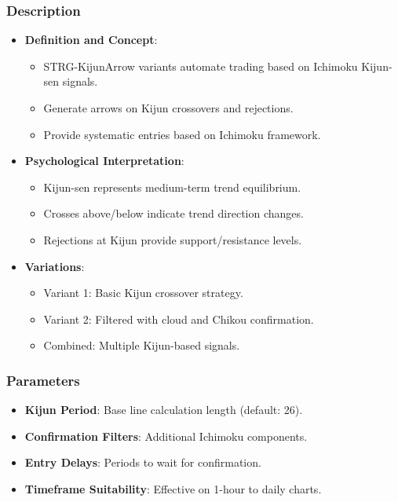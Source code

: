 \documentclass[12pt]{article}
\begin{document}
\subsubsection{Description}
\begin{itemize}
\item \textbf{Definition and Concept}:
  \begin{itemize}
  \item STRG-KijunArrow variants automate trading based on Ichimoku Kijun-sen signals.
  \item Generate arrows on Kijun crossovers and rejections.
  \item Provide systematic entries based on Ichimoku framework.
  \end{itemize}
\item \textbf{Psychological Interpretation}:
  \begin{itemize}
  \item Kijun-sen represents medium-term trend equilibrium.
  \item Crosses above/below indicate trend direction changes.
  \item Rejections at Kijun provide support/resistance levels.
  \end{itemize}
\item \textbf{Variations}:
  \begin{itemize}
  \item Variant 1: Basic Kijun crossover strategy.
  \item Variant 2: Filtered with cloud and Chikou confirmation.
  \item Combined: Multiple Kijun-based signals.
  \end{itemize}
\end{itemize}

\subsubsection{Parameters}
\begin{itemize}
\item \textbf{Kijun Period}: Base line calculation length (default: 26).
\item \textbf{Confirmation Filters}: Additional Ichimoku components.
\item \textbf{Entry Delays}: Periods to wait for confirmation.
\item \textbf{Timeframe Suitability}: Effective on 1-hour to daily charts.
\end{itemize}
\end{document}
